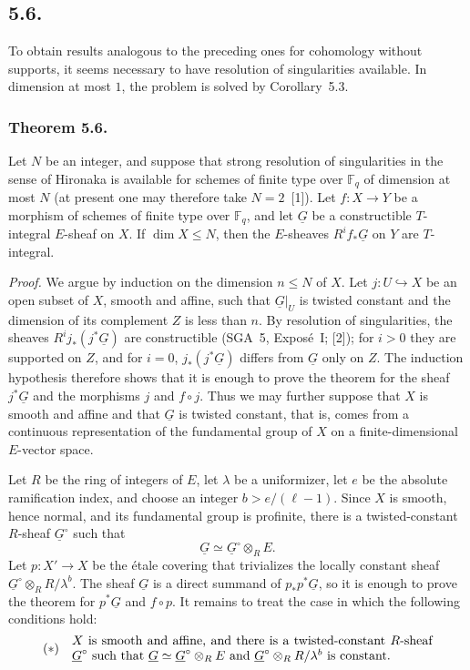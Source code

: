 \subsection*{5.6.}
To obtain results analogous to the preceding ones for cohomology without
supports, it seems necessary to have resolution of singularities available.
In dimension at most $1$, the problem is solved by Corollary~5.3.

\subsubsection*{Theorem 5.6.}
Let $N$ be an integer, and suppose that strong resolution of singularities
in the sense of Hironaka is available for schemes of finite type over
$\mathbb F_q$ of dimension at most $N$ (at present one may therefore take
$N=2$~[1]).  Let $f:X\longrightarrow Y$ be a morphism of schemes of finite
type over $\mathbb F_q$, and let $\underline G$ be a constructible
$T$-integral $E$-sheaf on $X$.  If $\dim X\leq N$, then the $E$-sheaves
$R^if_*\underline G$ on $Y$ are $T$-integral.

\medskip
\noindent\emph{Proof.}
We argue by induction on the dimension $n\leq N$ of $X$.  Let
$j:U\hookrightarrow X$ be an open subset of $X$, smooth and affine, such
that $\underline G|_U$ is twisted constant and the dimension of its
complement $Z$ is less than $n$.  By resolution of singularities, the
sheaves $R^ij_*(j^*\underline G)$ are constructible
(SGA~5, Expos\'e~I; [2]); for $i>0$ they are supported on $Z$, and for
$i=0$, $j_*(j^*\underline G)$ differs from $\underline G$ only on $Z$.
The induction hypothesis therefore shows that it is enough to prove the
theorem for the sheaf $j^*\underline G$ and the morphisms $j$ and
$f\circ j$.  Thus we may further suppose that $X$ is smooth and affine and
that $\underline G$ is twisted constant, that is, comes from a continuous
representation of the fundamental group of $X$ on a finite-dimensional
$E$-vector space.

Let $R$ be the ring of integers of $E$, let $\lambda$ be a uniformizer, let
$e$ be the absolute ramification index, and choose an integer
$b>e/(\ell-1)$.  Since $X$ is smooth, hence normal, and its fundamental
group is profinite, there is a twisted-constant $R$-sheaf
$\underline G^\circ$ such that
\[
\underline G\simeq\underline G^\circ\otimes_R E.
\]
Let $p:X'\longrightarrow X$ be the \'etale covering that trivializes the
locally constant sheaf
$\underline G^\circ\otimes_R R/\lambda^b$.  The sheaf $\underline G$ is a
direct summand of $p_*p^*\underline G$, so it is enough to prove the theorem
for $p^*\underline G$ and $f\circ p$.  It remains to treat the case in which
the following conditions hold:
\[
(*)\quad
\begin{minipage}{0.82\linewidth}
$X$ is smooth and affine, and there is a twisted-constant $R$-sheaf
$\underline G^\circ$ such that
$\underline G\simeq\underline G^\circ\otimes_R E$ and
$\underline G^\circ\otimes_R R/\lambda^b$ is constant.
\end{minipage}
\]

